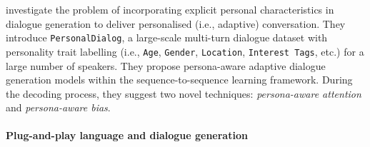 \cite{zheng2019personalized} investigate the problem of incorporating explicit personal characteristics in dialogue generation to deliver personalised (i.e., adaptive) conversation. They introduce \texttt{PersonalDialog}, a large-scale multi-turn dialogue dataset with personality trait labelling (i.e., \texttt{Age}, \texttt{Gender}, \texttt{Location}, \texttt{Interest Tags}, etc.) for a large number of speakers. They propose persona-aware adaptive dialogue generation models within the sequence-to-sequence learning framework. During the decoding process, they suggest two novel techniques: \textit{persona-aware attention} and \textit{persona-aware bias}.

\paragraph{Plug-and-play language and dialogue generation}

